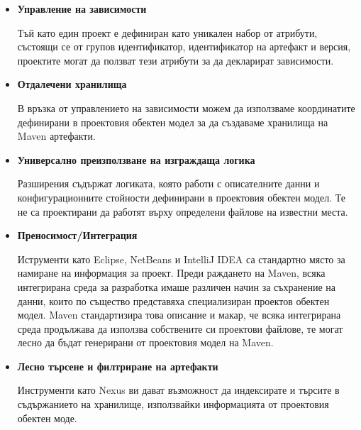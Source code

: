 \begin{itemize}
  \item \textbf{Управление на зависимости}

    Тъй като един проект е дефиниран като уникален набор от
    атрибути, състоящи се от групов идентификатор, идентификатор на
    артефакт и версия, проектите могат да ползват тези атрибути за да
    декларират зависимости.

  \item \textbf{Отдалечени хранилища}
    
    В връзка от управлението на зависимости можем да използваме
    координатите дефинирани в проектовия обектен модел за да създаваме
    хранилища на Maven артефакти.
  
  \item \textbf{Универсално преизползване на изграждаща логика}
    
    Разширения съдържат логиката, която работи с описателните данни и
    конфигурационните стойности дефинирани в проектовия обектен
    модел. Те не са проектирани да работят върху определени файлове на
    известни места.

  \item \textbf{Преносимост/Интеграция}
    
    Иструменти като Eclipse, NetBeans и IntelliJ IDEA са стандартно
    място за намиране на информация за проект. Преди раждането на
    Maven, всяка интегрирана среда за разработка имаше различен начин
    за съхранение на данни, които по същество представяха
    специализиран проектов обектен модел. Maven стандартизира това
    описание и макар, че всяка интегрирана среда продължава да
    използва собствените си проектови файлове, те могат лесно да бъдат
    генерирани от проектовия модел на Maven.

  \item \textbf{Лесно търсене и филтриране на артефакти}
    
    Инструменти като Nexus ви дават възможност да индексирате и
    търсите в съдържанието на хранилище, използвайки информацията от
    проектовия обектен моде.
\end{itemize}

